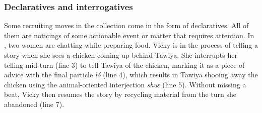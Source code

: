 \documentclass[output=paper]{langsci/langscibook}
\begin{document}
\subsubsection{Declaratives and interrogatives}\label{sec:dingemanse:3.2.2}

Some recruiting moves in the collection come in the form of declaratives. All of them are noticings of some actionable event or matter that requires attention. In , two women are chatting while preparing food. Vicky is in the process of telling a story when she sees a chicken coming up behind Tawiya. She interrupts her telling mid-turn (line 3) to tell Tawiya of the chicken, marking it as a piece of advice with the final particle \textit{ló} (line 4), which results in Tawiya shooing away the chicken using the animal-oriented interjection \textit{shuɛ} (line 5). Without missing a beat, Vicky then resumes the story by recycling material from the turn she abandoned (line 7).
\end{document}
